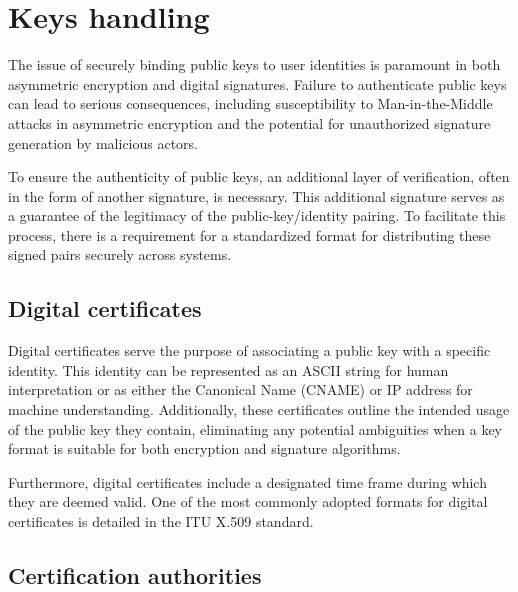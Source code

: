 \section{Keys handling}

The issue of securely binding public keys to user identities is paramount in both asymmetric encryption and digital signatures.
Failure to authenticate public keys can lead to serious consequences, including susceptibility to Man-in-the-Middle attacks in asymmetric encryption and the potential for unauthorized signature generation by malicious actors.

To ensure the authenticity of public keys, an additional layer of verification, often in the form of another signature, is necessary. 
This additional signature serves as a guarantee of the legitimacy of the public-key/identity pairing. 
To facilitate this process, there is a requirement for a standardized format for distributing these signed pairs securely across systems.

\subsection{Digital certificates}
Digital certificates serve the purpose of associating a public key with a specific identity. 
This identity can be represented as an ASCII string for human interpretation or as either the Canonical Name (CNAME) or IP address for machine understanding. 
Additionally, these certificates outline the intended usage of the public key they contain, eliminating any potential ambiguities when a key format is suitable for both encryption and signature algorithms.

Furthermore, digital certificates include a designated time frame during which they are deemed valid. 
One of the most commonly adopted formats for digital certificates is detailed in the ITU X.509 standard.

\subsection{Certification authorities}










